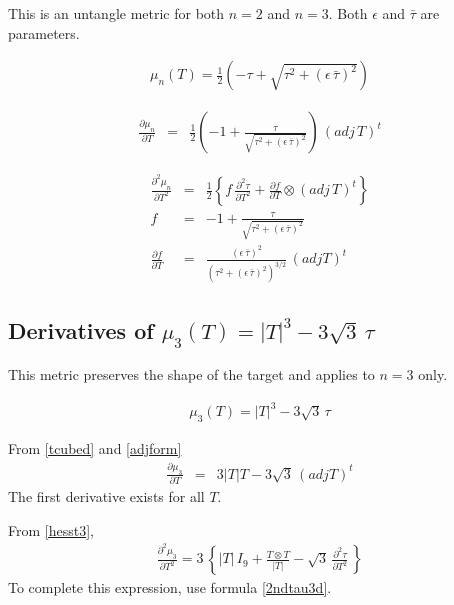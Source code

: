 \documentclass{report}
\begin{document}
\noindent This is an untangle metric for both $n=2$ and $n=3$. Both 
$\epsilon$ and $\bar{\tau}$ are parameters. \newline

\begin{eqnarray} 
\mu_n(T) = \frac{1}{2} \left( - \tau + \sqrt{\tau^2 + \left(\epsilon \, \bar{\tau} \right)^2} \right)
\end{eqnarray}

\begin{eqnarray}
\frac{\partial \mu_n}{\partial T} & = & \frac{1}{2} \left( -1 + \frac{\tau}{\sqrt{\tau^2 + \left(\epsilon \, \bar{\tau} \right)^2}} \right) \, (adj \, T)^t 
\end{eqnarray}

\begin{eqnarray}
\frac{\partial^2 \mu_n}{\partial T^2} & = & \frac{1}{2} \left\{ f \, \frac{\partial^2 \tau}{\partial T^2} + \frac{\partial f}{\partial T} \otimes (adj \, T)^t \right\} \\
f & = & -1 +  \frac{\tau}{\sqrt{\tau^2 + \left(\epsilon \, \bar{\tau} \right)^2}} \\
\frac{\partial f}{\partial T} & = & \frac{(\epsilon \, \bar{\tau})^2}{\left(\tau^2 + \left(\epsilon \, \bar{\tau} \right)^2 \right)^{3/2}} \, (adj T)^t
\end{eqnarray}


\subsection{Derivatives of $\mu_3(T) = |T|^3 - 3 \sqrt{3} \, \tau$}

\noindent This metric preserves the shape of the target and applies 
to $n=3$ only. \newline

\begin{eqnarray}
\mu_3 (T) = |T|^3 - 3 \sqrt{3} \, \tau
\end{eqnarray}

\noindent From \ref{tcubed} and \ref{adjform}
\begin{eqnarray}
\frac{\partial \mu_3}{\partial T} & = & 3 |T| T - 3 \sqrt{3} \, (adj T)^t
\end{eqnarray}
The first derivative exists for all $T$. \newline

\noindent From \ref{hesst3},
\begin{eqnarray}
\frac{\partial^2 \mu_3}{\partial T^2} = 3 \, \left\{ |T| \, I_9 + \frac{T \otimes T}{|T|} - \sqrt{3} \, \frac{\partial^2 \tau}{\partial T^2} \, \right\}
\end{eqnarray}
To complete this expression, use formula \ref{2ndtau3d}. \newline
\end{document}
